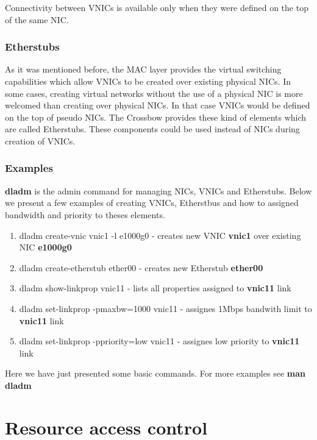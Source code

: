 \documentclass[11pt]{book}
\begin{document}
			Connectivity between VNICs is available only when they were defined on the top of the same NIC. 

			\subsubsection{Etherstubs}

        As it was mentioned before, the MAC layer provides the virtual switching capabilities which allow VNICs to be created over existing physical NICs.
        In some cases, creating virtual networks without the use of a physical NIC is more welcomed than creating over physical NICs. In that case VNICs 
        would be defined on the top of pseudo NICs. The Crossbow provides these kind of elements which are called Etherstubs. These components could be used
        instead of NICs during creation of VNICs.
		
			\subsubsection{Examples}

        \textbf{dladm} is the admin command for managing NICs, VNICs and Etherstubs. Below we present a few examples of creating VNICs, Etherstbus and how
        to assigned bandwidth and priority to theses elements.

        \begin{enumerate}
        	\item{dladm create-vnic vnic1 -l e1000g0 - creates new VNIC \textbf{vnic1} over existing NIC \textbf{e1000g0}}
        	\item{dladm create-etherstub ether00 - creates new Etherstub \textbf{ether00}}
        	\item{dladm show-linkprop vnic11 - lists all properties assigned to \textbf{vnic11} link}
        	\item{dladm set-linkprop -pmaxbw=1000 vnic11 - assignes 1Mbps bandwith limit to \textbf{vnic11} link}
        	\item{dladm set-linkprop -ppriority=low vnic11 - assignes low priority to \textbf{vnic11} link}
        \end{enumerate}

        Here we have just presented some basic commands. For more examples see \textbf{man dladm}
        

    \section{Resource access control}
\end{document}
